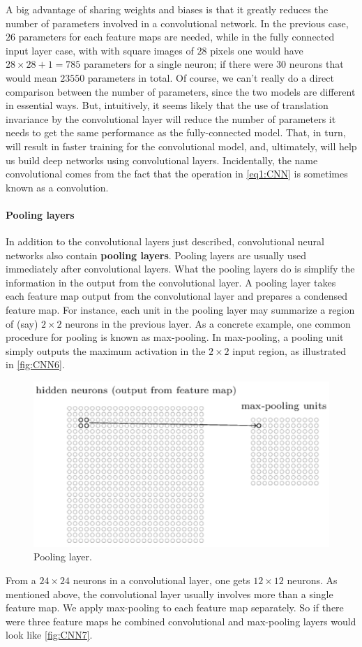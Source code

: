 \documentclass[12pt, letterpaper]{article}
\theoremstyle{definition}
\let\tb\textbf
\begin{document}
A big advantage of sharing weights and biases is that it greatly reduces the number of parameters involved in a convolutional network. In the previous case, $26$ parameters for each feature maps are needed, while in the fully connected input layer case, with with square images of $28$ pixels one would have $28\times 28+1 = 785$ parameters for a single neuron; if there were $30$ neurons that would mean $23550$ parameters in total.
Of course, we can't really do a direct comparison between the number of parameters, since the two models are different in essential ways. But, intuitively, it seems likely that the use of translation invariance by the convolutional layer will reduce the number of parameters it needs to get the same performance as the fully-connected model. That, in turn, will result in faster training for the convolutional model, and, ultimately, will help us build deep networks using convolutional layers. Incidentally, the name convolutional comes from the fact that the operation in \autoref{eq1:CNN} is sometimes known as a convolution. 

\paragraph{\tb{Pooling layers}} In addition to the convolutional layers just described, convolutional neural networks also contain \tb{pooling layers}. Pooling layers are usually used immediately after convolutional layers. What the pooling layers do is simplify the information in the output from the convolutional layer. A pooling layer takes each feature map output from the convolutional layer and prepares a condensed feature map. For instance, each unit in the pooling layer may summarize a region of (say) $2\times 2$ neurons in the previous layer. As a concrete example, one common procedure for pooling is known as max-pooling. In max-pooling, a pooling unit simply outputs the maximum activation in the $2\times 2$ input region, as illustrated in \autoref{fig:CNN6}.

\begin{figure}
\centering
\includegraphics[scale=0.5]{img/CNN6}
\caption{Pooling layer.}
\label{fig:CNN6}
\end{figure}
From a $24\times 24$ neurons in a convolutional layer, one gets $12\times 12$ neurons. As mentioned above, the convolutional layer usually involves more than a single feature map. We apply max-pooling to each feature map separately. So if there were three feature maps he combined convolutional and max-pooling layers would look like \autoref{fig:CNN7}.
\end{document}
